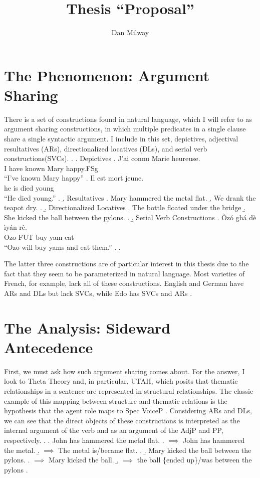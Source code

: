 \documentclass[letterpaper]{article}
\title{Thesis ``Proposal''}
\author{Dan Milway}
\begin{document}
\maketitle

\section{The Phenomenon: Argument Sharing}
There is a set of constructions found in natural language, which I will refer to as argument sharing constructions, in which multiple predicates in a single clause share a single syntactic argument.
I include in this set, depictives, adjectival resultatives (ARs), directionalized locatives (DLs), and serial verb constructions(SVCs).
\ex.
  \a. Depictives \parencite[French,][]{legendre1997secondary}
    \ag. J'ai connu Marie heureuse.\\
    {I have} known Mary happy.FSg\\
    ``I've known Mary happy''
    \bg. Il est mort jeune.\\
    he is died young\\
    ``He died young.''
    \z.
  \b. Resultatives
    \a. Mary hammered the metal flat.
    \b. We drank the teapot dry.
    \z.
  \b. Directionalized Locatives
    \a. The bottle floated under the bridge
    \b. She kicked the ball between the pylons.
    \z.
  \b. Serial Verb Constructions \parencite[Edo,][]{bakerstewart1999double}
    \ag. \`Oz\'o gh\'a d\`e ìy\'an r\`e.\\
    Ozo FUT buy yam eat\\
    ``Ozo will buy yams and eat them.''
    \z.
  \z.

The latter three constructions are of particular interest in this thesis due to the fact that they seem to be parameterized in natural language.
Most varieties of French, for example, lack all of these constructions. English and German have ARs and DLs but lack SVCs, while Edo has SVCs and ARs \parencite{bakerstewart1999double}.

\section{The Analysis: Sideward Antecedence}
First, we must ask how such argument sharing comes about.
For the answer, I look to Theta Theory and, in particular,  UTAH, which posits that thematic relationships in a sentence are represented in structural relationships.
The classic example of this mapping between structure and thematic relations is the hypothesis that the agent role maps to Spec VoiceP \parencite{kratzer_severing_1996}.
Considering ARs and DLs, we can see that the direct objects of these constructions is interpreted as the internal argument of the verb and as an argument of the AdjP and PP, respectively.
\ex.
\a. John has hammered the metal flat.
\a. $\implies$ John has hammered the metal.
\b. $\implies$ The metal is/became flat.
\z.
\b. Mary kicked the ball between the pylons.
\a. $\implies$ Mary kicked the ball.
\b. $\implies$ the ball \{ended up\}/was between the pylons
\z.
\end{document}
